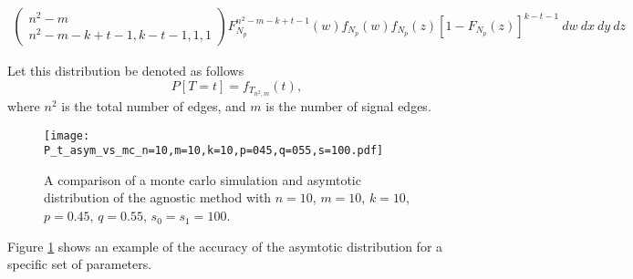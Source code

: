 \documentclass{article}
\begin{document}
\begin{eqnarray}
          \left(\begin{matrix} n^2-m \\ n^2-m-k+t-1, k-t-1, 1, 1 \end{matrix}\right)
          F_{N_p}^{n^2-m-k+t-1}(w) f_{N_p}(w) f_{N_p}(z)[1-F_{N_p}(z)]^{k-t-1}
    \ dw \ dx \ dy\ dz
\end{eqnarray}


Let this distribution be denoted as follows
\[
P[T=t] = f_{T_{n^2, m}}(t),
\]
where $n^2$ is the total number of edges, and $m$ is the number of signal edges.


\begin{figure}[h]
\centering
\texttt{[image: P\_t\_asym\_vs\_mc\_n=10,m=10,k=10,p=045,q=055,s=100.pdf]}
\caption{A comparison of a monte carlo simulation and asymtotic distribution of the agnostic method with $n=10$, $m=10$, $k=10$, $p=0.45$, $q=0.55$, $s_0=s_1=100$.}
\label{fig:ag_asym}
\end{figure}

Figure \ref{fig:ag_asym} shows an example of the accuracy of the asymtotic distribution for a specific set of parameters.
\end{document}
